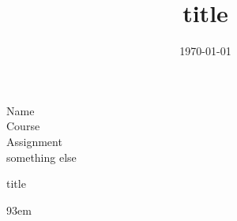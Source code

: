 \documentclass[12pt,titlepage]{article}
\title{title}
\author{}
\date{\today}
\begin{document}
\begin{doublespace}
\noindent Name\\
          Course\\
          Assignment\\
          something else
          \begin{center}title\end{center}



\end{doublespace}

\def\bibindent{3em}
\renewcommand{\refname}{Bibliography}
\makeatletter
\renewcommand\@biblabel[1]{}
\let\old@biblabel\@biblabel
\def\@biblabel#1{\old@biblabel{#1}\kern\bibindent}
\let\old@bibitem\bibitem
\def\bibitem#1{\old@bibitem{#1}\leavevmode\kern-\bibindent}
\makeatother
\newpage
\begin{thebibliography}{9\kern\bibindent}

\end{thebibliography}
\end{document}
